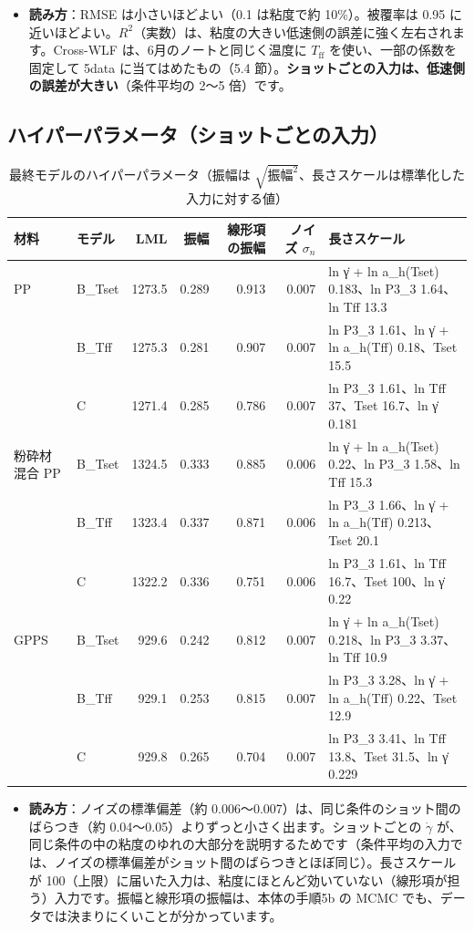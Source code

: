 \documentclass[paper=a4paper,fontsize=10.5pt,line_length=44zw,number_of_lines=38]{jlreq}
\newcommand{\gd}{\dot{\gamma}}
\newcommand{\Tff}{T_{\mathrm{ff}}}
\newenvironment{points}{\begin{itemize}[label=$\triangleright$,leftmargin=1.5\zw,itemsep=0.3ex,topsep=0.5ex,parsep=0pt]}{\end{itemize}}
\newcommand{\pt}[1]{\item \textbf{#1}：}
\begin{document}
\begin{points}
\pt{読み方}RMSE は小さいほどよい（0.1 は粘度で約 10\%）。被覆率は 0.95 に近いほどよい。$R^2$（実数）は、粘度の大きい低速側の誤差に強く左右されます。Cross-WLF は、6月のノートと同じく温度に $\Tff$ を使い、一部の係数を固定して 5data に当てはめたもの（5.4 節）。\textbf{ショットごとの入力は、低速側の誤差が大きい}（条件平均の 2〜5 倍）です。
\end{points}

\subsection{ハイパーパラメータ（ショットごとの入力）}
\begin{table}[H]
\caption{最終モデルのハイパーパラメータ（振幅は $\sqrt{\text{振幅}^2}$、長さスケールは標準化した入力に対する値）}\label{tab:hp}
\scriptsize
\begin{tabularx}{\linewidth}{@{}llrrrrX@{}}
\toprule
材料 & モデル & LML & 振幅 & 線形項の振幅 & ノイズ $\sigma_n$ & 長さスケール \\
\midrule
PP & B\_Tset & 1273.5 & 0.289 & 0.913 & 0.007 & ln γ̇ + ln a\_h(Tset) 0.183、ln P3\_3 1.64、ln Tff 13.3 \\
 & B\_Tff & 1275.3 & 0.281 & 0.907 & 0.007 & ln P3\_3 1.61、ln γ̇ + ln a\_h(Tff) 0.18、Tset 15.5 \\
 & C & 1271.4 & 0.285 & 0.786 & 0.007 & ln P3\_3 1.61、ln Tff 37、Tset 16.7、ln γ̇ 0.181 \\
\midrule
粉砕材混合 PP & B\_Tset & 1324.5 & 0.333 & 0.885 & 0.006 & ln γ̇ + ln a\_h(Tset) 0.22、ln P3\_3 1.58、ln Tff 15.3 \\
 & B\_Tff & 1323.4 & 0.337 & 0.871 & 0.006 & ln P3\_3 1.66、ln γ̇ + ln a\_h(Tff) 0.213、Tset 20.1 \\
 & C & 1322.2 & 0.336 & 0.751 & 0.006 & ln P3\_3 1.61、ln Tff 16.7、Tset 100、ln γ̇ 0.22 \\
\midrule
GPPS & B\_Tset & 929.6 & 0.242 & 0.812 & 0.007 & ln γ̇ + ln a\_h(Tset) 0.218、ln P3\_3 3.37、ln Tff 10.9 \\
 & B\_Tff & 929.1 & 0.253 & 0.815 & 0.007 & ln P3\_3 3.28、ln γ̇ + ln a\_h(Tff) 0.22、Tset 12.9 \\
 & C & 929.8 & 0.265 & 0.704 & 0.007 & ln P3\_3 3.41、ln Tff 13.8、Tset 31.5、ln γ̇ 0.229 \\

\bottomrule
\end{tabularx}
\end{table}
\begin{points}
\pt{読み方}ノイズの標準偏差（約 0.006〜0.007）は、同じ条件のショット間のばらつき（約 0.04〜0.05）よりずっと小さく出ます。ショットごとの $\gd$ が、同じ条件の中の粘度のゆれの大部分を説明するためです（条件平均の入力では、ノイズの標準偏差がショット間のばらつきとほぼ同じ）。長さスケールが 100（上限）に届いた入力は、粘度にほとんど効いていない（線形項が担う）入力です。振幅と線形項の振幅は、本体の手順5b の MCMC でも、データでは決まりにくいことが分かっています。
\end{points}
\end{document}
